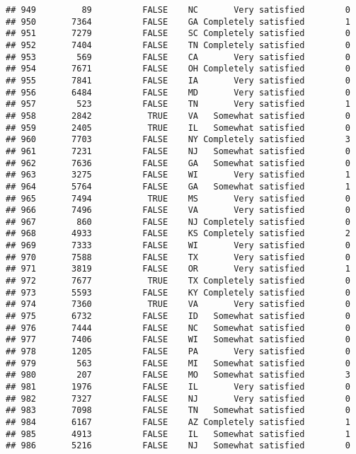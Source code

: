 \documentclass[]{book}
\theoremstyle{definition}
\theoremstyle{definition}
\theoremstyle{remark}
\begin{document}
\begin{verbatim}
## 949         89          FALSE    NC       Very satisfied        0
## 950       7364          FALSE    GA Completely satisfied        1
## 951       7279          FALSE    SC Completely satisfied        0
## 952       7404          FALSE    TN Completely satisfied        0
## 953        569          FALSE    CA       Very satisfied        0
## 954       7671          FALSE    OH Completely satisfied        0
## 955       7841          FALSE    IA       Very satisfied        0
## 956       6484          FALSE    MD       Very satisfied        0
## 957        523          FALSE    TN       Very satisfied        1
## 958       2842           TRUE    VA   Somewhat satisfied        0
## 959       2405           TRUE    IL   Somewhat satisfied        0
## 960       7703          FALSE    NY Completely satisfied        3
## 961       7231          FALSE    NJ   Somewhat satisfied        0
## 962       7636          FALSE    GA   Somewhat satisfied        0
## 963       3275          FALSE    WI       Very satisfied        1
## 964       5764          FALSE    GA   Somewhat satisfied        1
## 965       7494           TRUE    MS       Very satisfied        0
## 966       7496          FALSE    VA       Very satisfied        0
## 967        860          FALSE    NJ Completely satisfied        0
## 968       4933          FALSE    KS Completely satisfied        2
## 969       7333          FALSE    WI       Very satisfied        0
## 970       7588          FALSE    TX       Very satisfied        0
## 971       3819          FALSE    OR       Very satisfied        1
## 972       7677           TRUE    TX Completely satisfied        0
## 973       5593          FALSE    KY Completely satisfied        0
## 974       7360           TRUE    VA       Very satisfied        0
## 975       6732          FALSE    ID   Somewhat satisfied        0
## 976       7444          FALSE    NC   Somewhat satisfied        0
## 977       7406          FALSE    WI   Somewhat satisfied        0
## 978       1205          FALSE    PA       Very satisfied        0
## 979        563          FALSE    MI   Somewhat satisfied        0
## 980        207          FALSE    MO   Somewhat satisfied        3
## 981       1976          FALSE    IL       Very satisfied        0
## 982       7327          FALSE    NJ       Very satisfied        0
## 983       7098          FALSE    TN   Somewhat satisfied        0
## 984       6167          FALSE    AZ Completely satisfied        1
## 985       4913          FALSE    IL   Somewhat satisfied        1
## 986       5216          FALSE    NJ   Somewhat satisfied        0

\end{verbatim}
\end{document}
